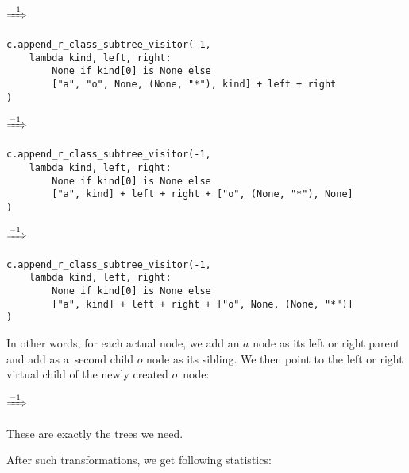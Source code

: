 \documentclass[final]{article}
\theoremstyle{definition}
\theoremstyle{definition}
\theoremstyle{remark}
\newcommand{\includeinlinesvg}[2]{\begin{minipage}{#1\textwidth}\end{minipage}}
\newcommand{\includeinlinescaledsvg}[3]{\begin{minipage}{#1\textwidth}\begin{center}\end{center}\end{minipage}}
\begin{document}
\begin{center}
    \includeinlinescaledsvg{.4}{.7}{lambda__transformations__009a}%
    \(\xRightarrow{-1}\)%
    \includeinlinescaledsvg{.4}{.7}{lambda__transformations__009b}%
\end{center}

\begin{lstlisting}
c.append_r_class_subtree_visitor(-1,
    lambda kind, left, right:
        None if kind[0] is None else
        ["a", "o", None, (None, "*"), kind] + left + right
)
\end{lstlisting}

\begin{center}
    \includeinlinescaledsvg{.4}{.7}{lambda__transformations__010a}%
    \(\xRightarrow{-1}\)%
    \includeinlinescaledsvg{.4}{.7}{lambda__transformations__010b}%
\end{center}

\begin{lstlisting}
c.append_r_class_subtree_visitor(-1,
    lambda kind, left, right:
        None if kind[0] is None else
        ["a", kind] + left + right + ["o", (None, "*"), None]
)
\end{lstlisting}

\begin{center}
    \includeinlinescaledsvg{.4}{.7}{lambda__transformations__011a}%
    \(\xRightarrow{-1}\)%
    \includeinlinescaledsvg{.4}{.7}{lambda__transformations__011b}%
\end{center}

\begin{lstlisting}
c.append_r_class_subtree_visitor(-1,
    lambda kind, left, right:
        None if kind[0] is None else
        ["a", kind] + left + right + ["o", None, (None, "*")]
)
\end{lstlisting}

In other words, for each actual node, we add an \(a\) node as its left or right parent and add as a~second child \(o\) node as its sibling. We then point to the left or right virtual child of the newly created \(o\)~node:

\includeinlinesvg{.20}{lambda__trees_200__0_base}%
\(\xRightarrow{-1}\)%
\includeinlinesvg{.20}{lambda__trees_200__0}%
\includeinlinesvg{.20}{lambda__trees_201__0}%
\includeinlinesvg{.20}{lambda__trees_202__0}%
\includeinlinesvg{.20}{lambda__trees_203__0}%

These are exactly the trees we need.

After such transformations, we get following statistics:
\end{document}
